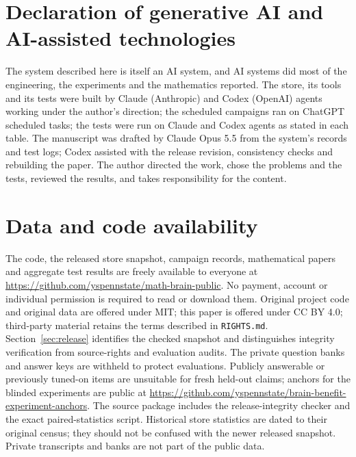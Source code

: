 \documentclass[11pt,reqno]{amsart}
\theoremstyle{plain}
\theoremstyle{definition}
\theoremstyle{remark}
\begin{document}
\section*{Declaration of generative AI and AI-assisted technologies}
The system described here is itself an AI system, and AI systems did most of the engineering, the experiments and the mathematics reported. The store, its tools and its tests were built by Claude (Anthropic) and Codex (OpenAI) agents working under the author's direction; the scheduled campaigns ran on ChatGPT scheduled tasks; the tests were run on Claude and Codex agents as stated in each table. The manuscript was drafted by Claude Opus 5.5 from the system's records and test logs; Codex assisted with the release revision, consistency checks and rebuilding the paper. The author directed the work, chose the problems and the tests, reviewed the results, and takes responsibility for the content.

\section*{Data and code availability}
The code, the released store snapshot, campaign records, mathematical papers and aggregate test results are freely available to everyone at \url{https://github.com/yspennstate/math-brain-public}. No payment, account or individual permission is required to read or download them. Original project code and original data are offered under MIT; this paper is offered under CC BY 4.0; third-party material retains the terms described in \texttt{RIGHTS.md}. Section~\ref{sec:release} identifies the checked snapshot and distinguishes integrity verification from source-rights and evaluation audits. The private question banks and answer keys are withheld to protect evaluations. Publicly answerable or previously tuned-on items are unsuitable for fresh held-out claims; anchors for the blinded experiments are public at \url{https://github.com/yspennstate/brain-benefit-experiment-anchors}. The source package includes the release-integrity checker and the exact paired-statistics script. Historical store statistics are dated to their original census; they should not be confused with the newer released snapshot. Private transcripts and banks are not part of the public data.


\end{document}
